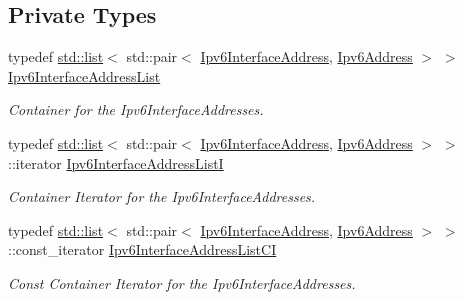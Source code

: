 \subsection*{Private Types}
\begin{DoxyCompactItemize}
\item 
typedef \hyperlink{openflow-interface_8h_afd9bcfa176617760671b67580f536fa7}{std\+::list}$<$ std\+::pair$<$ \hyperlink{classns3_1_1Ipv6InterfaceAddress}{Ipv6\+Interface\+Address}, \hyperlink{classns3_1_1Ipv6Address}{Ipv6\+Address} $>$ $>$ \hyperlink{classns3_1_1Ipv6Interface_a8983603129d14da06c4bdeec91f1f9df}{Ipv6\+Interface\+Address\+List}
\begin{DoxyCompactList}\small\item\em Container for the Ipv6\+Interface\+Addresses. \end{DoxyCompactList}\item 
typedef \hyperlink{openflow-interface_8h_afd9bcfa176617760671b67580f536fa7}{std\+::list}$<$ std\+::pair$<$ \hyperlink{classns3_1_1Ipv6InterfaceAddress}{Ipv6\+Interface\+Address}, \hyperlink{classns3_1_1Ipv6Address}{Ipv6\+Address} $>$ $>$\+::iterator \hyperlink{classns3_1_1Ipv6Interface_abd1fec0453b6db8c7c77cd2e8f3085b4}{Ipv6\+Interface\+Address\+ListI}
\begin{DoxyCompactList}\small\item\em Container Iterator for the Ipv6\+Interface\+Addresses. \end{DoxyCompactList}\item 
typedef \hyperlink{openflow-interface_8h_afd9bcfa176617760671b67580f536fa7}{std\+::list}$<$ std\+::pair$<$ \hyperlink{classns3_1_1Ipv6InterfaceAddress}{Ipv6\+Interface\+Address}, \hyperlink{classns3_1_1Ipv6Address}{Ipv6\+Address} $>$ $>$\+::const\+\_\+iterator \hyperlink{classns3_1_1Ipv6Interface_a715fc50c7b144e64d4849d26ad6c0b32}{Ipv6\+Interface\+Address\+List\+CI}
\begin{DoxyCompactList}\small\item\em Const Container Iterator for the Ipv6\+Interface\+Addresses. \end{DoxyCompactList}\end{DoxyCompactItemize}
